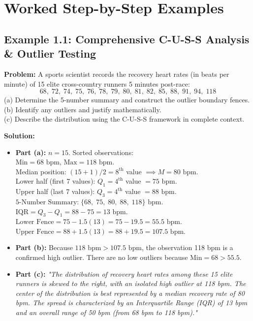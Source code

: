 \section{Worked Step-by-Step Examples}

\subsection*{Example 1.1: Comprehensive C-U-S-S Analysis \& Outlier Testing}
\textbf{Problem:} A sports scientist records the recovery heart rates (in beats per minute) of 15 elite cross-country runners 5 minutes post-race:
\[ 68, \; 72, \; 74, \; 75, \; 76, \; 78, \; 79, \; 80, \; 81, \; 82, \; 85, \; 88, \; 91, \; 94, \; 118 \]
(a) Determine the 5-number summary and construct the outlier boundary fences.\\
(b) Identify any outliers and justify mathematically.\\
(c) Describe the distribution using the C-U-S-S framework in complete context.

\textbf{Solution:}
\begin{itemize}[leftmargin=1.2em]
  \item \textbf{Part (a):} $n = 15$. Sorted observations:\\
  $\text{Min} = 68\text{ bpm}$, $\text{Max} = 118\text{ bpm}$.\\
  Median position: $(15+1)/2 = 8^{\text{th}}$ value $\implies M = 80\text{ bpm}$.\\
  Lower half (first 7 values): $Q_1 = 4^{\text{th}}$ value $= 75\text{ bpm}$.\\
  Upper half (last 7 values): $Q_3 = 4^{\text{th}}$ value $= 88\text{ bpm}$.\\
  $\text{5-Number Summary:} \; \{68, \; 75, \; 80, \; 88, \; 118\}\text{ bpm}$.\\
  $\text{IQR} = Q_3 - Q_1 = 88 - 75 = 13\text{ bpm}$.\\
  $\text{Lower Fence} = 75 - 1.5(13) = 75 - 19.5 = 55.5\text{ bpm}$.\\
  $\text{Upper Fence} = 88 + 1.5(13) = 88 + 19.5 = 107.5\text{ bpm}$.
  \item \textbf{Part (b):} Because $118\text{ bpm} > 107.5\text{ bpm}$, the observation 118 bpm is a confirmed high outlier. There are no low outliers because $\text{Min} = 68 > 55.5$.
  \item \textbf{Part (c):}
  \textit{"The distribution of recovery heart rates among these 15 elite runners is skewed to the right, with an isolated high outlier at 118 bpm. The center of the distribution is best represented by a median recovery rate of 80 bpm. The spread is characterized by an Interquartile Range (IQR) of 13 bpm and an overall range of 50 bpm (from 68 bpm to 118 bpm)."}
\end{itemize}

